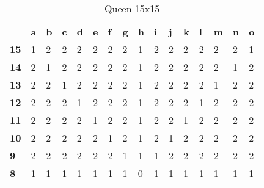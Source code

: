 \documentclass{article}
\begin{document}
\begin{table}[H]
\centering
\caption{Queen 15x15}
\label{my-label}
\begin{tabular}{llllllllllllllll}
                                 & \textbf{a} & \textbf{b} & \textbf{c} & \textbf{d} & \textbf{e} & \textbf{f} & \textbf{g} & \textbf{h} & \textbf{i} & \textbf{j} & \textbf{k} & \textbf{l} & \textbf{m} & \textbf{n} & \textbf{o} \\ \cline{2-16} 
\multicolumn{1}{l|}{\textbf{15}} & 1          & 2          & 2          & 2          & 2          & 2          & 2          & 1          & 2          & 2          & 2          & 2          & 2          & 2          & 1          \\
\multicolumn{1}{l|}{\textbf{14}} & 2          & 1          & 2          & 2          & 2          & 2          & 2          & 1          & 2          & 2          & 2          & 2          & 2          & 1          & 2          \\
\multicolumn{1}{l|}{\textbf{13}} & 2          & 2          & 1          & 2          & 2          & 2          & 2          & 1          & 2          & 2          & 2          & 2          & 1          & 2          & 2          \\
\multicolumn{1}{l|}{\textbf{12}} & 2          & 2          & 2          & 1          & 2          & 2          & 2          & 1          & 2          & 2          & 2          & 1          & 2          & 2          & 2          \\
\multicolumn{1}{l|}{\textbf{11}} & 2          & 2          & 2          & 2          & 1          & 2          & 2          & 1          & 2          & 2          & 1          & 2          & 2          & 2          & 2          \\
\multicolumn{1}{l|}{\textbf{10}} & 2          & 2          & 2          & 2          & 2          & 1          & 2          & 1          & 2          & 1          & 2          & 2          & 2          & 2          & 2          \\
\multicolumn{1}{l|}{\textbf{9}}  & 2          & 2          & 2          & 2          & 2          & 2          & 1          & 1          & 1          & 2          & 2          & 2          & 2          & 2          & 2          \\
\multicolumn{1}{l|}{\textbf{8}}  & 1          & 1          & 1          & 1          & 1          & 1          & 1          & 0          & 1          & 1          & 1          & 1          & 1          & 1          & 1          \\

\end{tabular}
\end{table}
\end{document}
